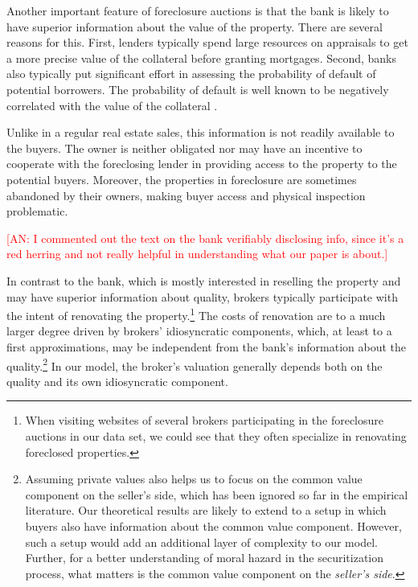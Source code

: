 \documentclass[11pt,twopage]{article}
\newcommand{\AN}[1]{\textcolor{red}{[AN: #1]}}
\begin{document}
Another important feature of foreclosure auctions is that the bank is
likely to have superior information about the value of the property. There are several reasons for
this. First, lenders typically spend large resources on appraisals to
get a more precise value of the collateral before granting
mortgages. %
Second, banks also typically put
significant effort in assessing the probability of default of
potential borrowers. The probability of default is well known to be
negatively correlated with the value of the collateral \cite[see][and the references therein]{qi2009loss}. 

Unlike in a regular real estate sales, this information is not readily available to the buyers. The owner is neither obligated nor may have an incentive to cooperate with the foreclosing lender in providing access to the property to the potential buyers. Moreover, the properties in foreclosure are sometimes abandoned by their owners, making buyer access and physical inspection problematic.

\AN{I commented out the text on the bank verifiably disclosing info, since it's a red herring and not really
helpful in understanding what our paper is about.}




In contrast to the bank, which is mostly interested in reselling the
property and may have superior information about quality, brokers
typically participate with the intent of renovating the
property.\footnote{When visiting websites of several brokers
  participating in the foreclosure auctions in our data set, we could
  see that they often specialize in renovating foreclosed properties.}
The costs of renovation are to a much larger degree driven by brokers'
idiosyncratic components, which, at least to a first approximations, may be independent from the bank's information about the quality.\footnote{Assuming private
  values also helps us to focus on the common value component on the
  seller's side, which has been ignored so far in the empirical
  literature. Our theoretical results are likely to extend to a setup
  in which buyers also have information about the common value
  component. However, such a setup would add an additional layer of complexity to
  our model. Further, for a better
  understanding of moral hazard in the securitization process, what
  matters is the common value component on the \emph{seller's side}.} In our model, the broker's valuation generally depends both on the quality and its own idiosyncratic component.
\end{document}
